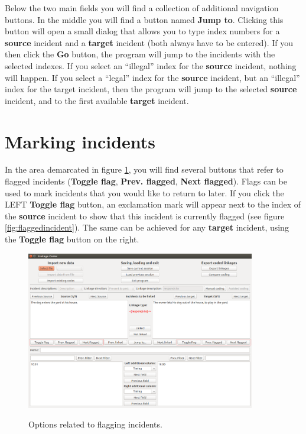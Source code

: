 \documentclass{memoir}
\begin{document}
Below the two main fields you will find a collection of additional navigation buttons. In the middle you will find a button named \textbf{Jump to}. Clicking this button will open a small dialog that allows you to type index numbers for a \textbf{source} incident and a \textbf{target} incident (both always have to be entered). If you then click the \textbf{Go} button, the program will jump to the incidents with the selected indexes. If you select an ``illegal'' index for the \textbf{source} incident, nothing will happen. If you select a ``legal'' index for the \textbf{source} incident, but an ``illegal'' index for the target incident, then the program will jump to the selected \textbf{source} incident, and to the first available \textbf{target} incident.

\section{Marking incidents}
\label{sec:markingincidents}

In the area demarcated in figure \ref{fig:flagoptions}, you will find several buttons that refer to flagged incidents (\textbf{Toggle flag}, \textbf{Prev. flagged}, \textbf{Next flagged}). Flags can be used to mark incidents that you would like to return to later. If you click the LEFT \textbf{Toggle flag} button, an exclamation mark will appear next to the index of the \textbf{source} incident to show that this incident is currently flagged (see figure \ref{fig:flaggedincident}). The same can be achieved for any \textbf{target} incident, using the \textbf{Toggle flag} button on the right.

\begin{figure}[h!]
  \centering
  \caption{Options related to flagging incidents.}
  \includegraphics[width=100mm]{Screenshot_15.pdf}
  \label{fig:flagoptions}
\end{figure}
\end{document}
